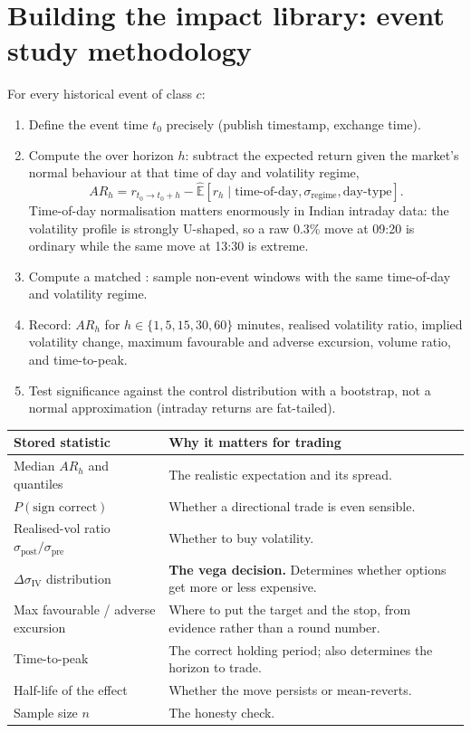 \section{Building the impact library: event study methodology}

For every historical event of class $c$:

\begin{enumerate}
\item Define the event time $t_0$ precisely (publish timestamp, exchange time).
\item Compute the  over horizon $h$: subtract the expected
return given the market's normal behaviour at that time of day and volatility
regime,
\[
AR_{h} = r_{t_0 \to t_0+h} - \hat{\mathbb{E}}\!\left[r_{h} \mid
\text{time-of-day}, \sigma_{\text{regime}}, \text{day-type}\right].
\]
Time-of-day normalisation matters enormously in Indian intraday data: the
volatility profile is strongly U-shaped, so a raw 0.3\% move at 09:20 is
ordinary while the same move at 13:30 is extreme.
\item Compute a matched : sample non-event windows
with the same time-of-day and volatility regime.
\item Record: $AR_h$ for $h \in \{1,5,15,30,60\}$ minutes, realised volatility
ratio, implied volatility change, maximum favourable and adverse excursion,
volume ratio, and time-to-peak.
\item Test significance against the control distribution with a bootstrap, not a
normal approximation (intraday returns are fat-tailed).
\end{enumerate}

\begin{longtable}{@{}p{4.0cm}p{10.6cm}@{}}
\toprule
\textbf{Stored statistic} & \textbf{Why it matters for trading}\\
\midrule
Median $AR_h$ and quantiles & The realistic expectation and its spread.\\
$P(\text{sign correct})$ & Whether a directional trade is even sensible.\\
Realised-vol ratio $\sigma_{\text{post}}/\sigma_{\text{pre}}$ & Whether to buy
volatility.\\
$\Delta\sigma_{\text{IV}}$ distribution & \textbf{The vega decision.} Determines
whether options get more or less expensive.\\
Max favourable / adverse excursion & Where to put the target and the stop, from
evidence rather than a round number.\\
Time-to-peak & The correct holding period; also determines the horizon to trade.\\
Half-life of the effect & Whether the move persists or mean-reverts.\\
Sample size $n$ & The honesty check.\\
\bottomrule
\end{longtable}

